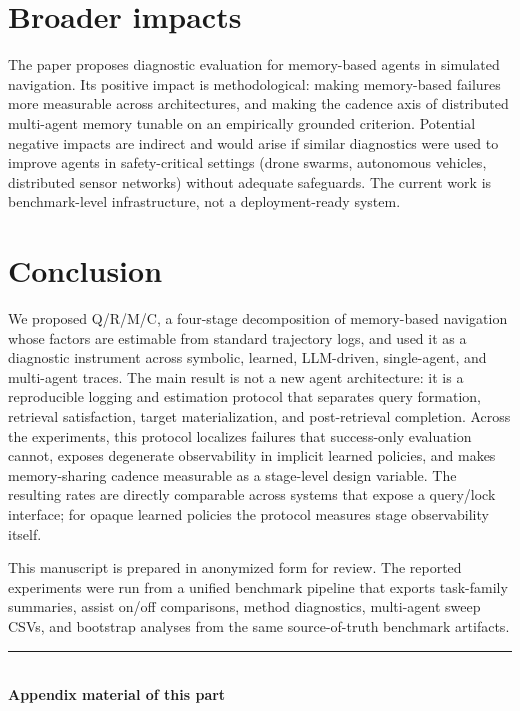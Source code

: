 \documentclass{article}
\begin{document}
\section{Broader impacts}

The paper proposes diagnostic evaluation for memory-based agents in simulated navigation. Its positive impact is methodological: making memory-based failures more measurable across architectures, and making the cadence axis of distributed multi-agent memory tunable on an empirically grounded criterion. Potential negative impacts are indirect and would arise if similar diagnostics were used to improve agents in safety-critical settings (drone swarms, autonomous vehicles, distributed sensor networks) without adequate safeguards. The current work is benchmark-level infrastructure, not a deployment-ready system.

\section{Conclusion}

We proposed Q/R/M/C, a four-stage decomposition of memory-based
navigation whose factors are estimable from standard trajectory logs,
and used it as a diagnostic instrument across symbolic, learned,
LLM-driven, single-agent, and multi-agent traces. The main result is
not a new agent architecture: it is a reproducible logging and
estimation protocol that separates query formation, retrieval
satisfaction, target materialization, and post-retrieval completion.
Across the experiments, this protocol localizes failures that
success-only evaluation cannot, exposes degenerate observability in
implicit learned policies, and makes memory-sharing cadence measurable
as a stage-level design variable. The resulting rates are directly
comparable across systems that expose a query/lock interface; for
opaque learned policies the protocol measures stage observability
itself.

\begin{ack}
This manuscript is prepared in anonymized form for review. The
reported experiments were run from a unified benchmark pipeline that
exports task-family summaries, assist on/off comparisons, method
diagnostics, multi-agent sweep CSVs, and bootstrap analyses from the
same source-of-truth benchmark artifacts.
\end{ack}

{\small

}

\FloatBarrier
\begin{center}\rule{0.55\linewidth}{0.4pt}\\[2pt]\textbf{Appendix material of this part}\end{center}
\end{document}
